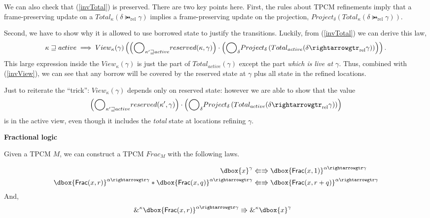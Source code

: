 \documentclass{article}
\newcommand\dboxed[1]{\dbox{\vphantom{t}\ensuremath{#1}}}
\newcommand{\viewshift}{\Rrightarrow}
\newcommand{\viewshiftBack}{\Lleftarrow}
\DeclareMathOperator{\rel}{rel}
\newcommand{\borrow}[2]{\textsc{\&}^{#1}#2}
\newcommand{\refines}{\rightarrowgtr}
\newcommand{\ltGe}{\sqsupseteq}
\newcommand\Bigcircle{\raisebox{-0.5mm}{\scalebox{1.7}{$\bigcirc$}}}
\begin{document}
We can also check that (\ref{invTotal}) is preserved. There are two key points here.
First, the rules about TPCM refinements imply that a frame-preserving update on a
$Total_\kappa(\delta \refines_{\rel} \gamma)$ implies a frame-preserving update
on the projection,
$Project_\delta(Total_\kappa(\delta \refines_{\rel} \gamma))$.

Second, we have to show why it is allowed to use borrowed state to justify the transitions.
Luckily, from (\ref{invTotal}) we can derive this law,
\[
  \kappa \ltGe active \implies View_\kappa(\gamma)\left(
      \left(
        \Bigcircle_{\kappa' \ltGe active} reserved(\kappa,\gamma)
      \right) \cdot
      \left(
        \Bigcircle_{\delta} Project_\delta\left(Total_{active}(\delta \refines_{\rel} \gamma)\right)
      \right)
    \right).
    \label{invDerived}
\]
This large expression inside the $View_\kappa(\gamma)$ is just the part of
$Total_{active}(\gamma)$ except the part \emph{which is live at $\gamma$}.
Thus, combined with (\ref{invView}), we can see that any borrow will be covered by the reserved 
state at $\gamma$ plus all state in the refined locations.

Just to reiterate the ``trick'': $View_\kappa(\gamma)$ depends only on reserved state:
however we are able to show that the value \[\left(
        \Bigcircle_{\kappa' \ltGe active} reserved(\kappa',\gamma)
      \right) \cdot
      \left(
        \Bigcircle_{\delta} Project_\delta\left(Total_{active}(\delta \refines_{\rel} \gamma)\right)
      \right)\] is in the active view, even though it includes the \emph{total} state at locations refining $\gamma$.

\newpage

\textbf{Fractional logic}

Given a TPCM $M$, we can construct a TPCM $Frac_M$ with the following laws.

\newcommand{\FFrac}{\textsf{Frac}}

\begin{align*}
  \dboxed{x}^\gamma &\viewshiftBack \viewshift \dboxed{\FFrac(x, 1)}^{\alpha \refines \gamma}\\
  \dboxed{\FFrac(x, r)}^{\alpha \refines \gamma}
    *
  \dboxed{\FFrac(x, q)}^{\alpha \refines \gamma}
    &\viewshiftBack \viewshift
  \dboxed{\FFrac(x, r+q)}^{\alpha \refines \gamma}
\end{align*}
And,
\begin{align*}
  \borrow{\kappa}{\dboxed{\FFrac(x, r)}^{\alpha \refines \gamma}} &\viewshift
  \borrow{\kappa}{\dboxed{x}^\gamma}
\end{align*}
\end{document}
